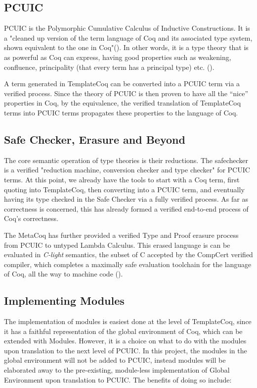 \subsection{PCUIC}
\label{sec:mc-pcuic}

PCUIC is the Polymorphic Cumulative Calculus of Inductive Constructions. It is a
"cleaned up version of the term language of Coq and its associated type system,
shown equivalent to the one in Coq"(\cite{metacoq}). In other words, it is a type
theory that is as powerful as Coq can express, having good properties such as
weakening, confluence, principality (that every term has a principal type) etc.
(\cite{coqcoqcorrect}).

A term generated in TemplateCoq can be converted into a PCUIC term via a
verified process. Since the theory of PCUIC is then proven to have all the
``nice'' properties in Coq, by the equivalence, the verified translation of
TemplateCoq terms into PCUIC terms propagates these properties to the language
of Coq.


\subsection{Safe Checker, Erasure and Beyond}
\label{sec:mc-beyond}
The core semantic operation of type theories is their reductions. The
safechecker is a verified "reduction machine, conversion checker and type
checker" for PCUIC terms. At this point, we already have the tools to start with
a Coq term, first quoting into TemplateCoq, then converting into a PCUIC term,
and eventually having its type checked in the Safe Checker via a fully verified
process. As far as correctness is concerned, this has already formed a verified
end-to-end process of Coq's correctness.

The MetaCoq has further provided a verified Type and Proof erasure process from
PCUIC to untyped Lambda Calculus. This erased language is can be evaluated in
\emph{C-light} semantics, the subset of C accepted by the CompCert verified
compiler, which completes a maximally safe evaluation toolchain for the language
of Coq, all the way to machine code (\cite{coqcoqcorrect}).

\subsection{Implementing Modules}
\label{sec:metacoq-myimpl}

The implementation of modules is easiest done at the level of TemplateCoq, since
it has a faithful representation of the global environment of Coq, which can be
extended with Modules. However, it is a choice on what to do with the modules
upon translation to the next level of PCUIC. In this project, the modules in the
global environment will not be added to PCUIC, instead modules will be
elaborated away to the pre-existing, module-less implementation of Global
Environment upon translation to PCUIC. The benefits of doing so include:

